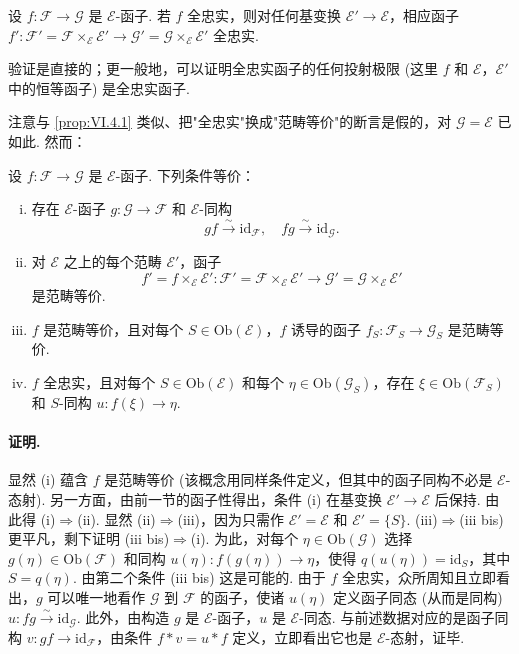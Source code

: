 \begin{proposition}\label{prop:VI.4.1}
设 $f \colon \mathcal{F} \to \mathcal{G}$ 是 $\mathcal{E}$-函子. 若 $f$ 全忠实，则对任何基变换 $\mathcal{E}' \to \mathcal{E}$，相应函子 $f' \colon \mathcal{F}' = \mathcal{F} \times_{\mathcal{E}} \mathcal{E}' \to \mathcal{G}' = \mathcal{G} \times_{\mathcal{E}} \mathcal{E}'$ 全忠实.
\end{proposition}

验证是直接的；更一般地，可以证明全忠实函子的任何投射极限 (这里 $f$ 和 $\mathcal{E}$，$\mathcal{E}'$ 中的恒等函子) 是全忠实函子.

注意与 \ref{prop:VI.4.1} 类似、把"全忠实"换成"范畴等价"的断言是假的，对 $\mathcal{G} = \mathcal{E}$ 已如此. 然而：

\begin{proposition}\label{prop:VI.4.2}
设 $f \colon \mathcal{F} \to \mathcal{G}$ 是 $\mathcal{E}$-函子. 下列条件等价：
\begin{enumerate}[(i)]
\item 存在 $\mathcal{E}$-函子 $g \colon \mathcal{G} \to \mathcal{F}$ 和 $\mathcal{E}$-同构
\[
gf \stackrel{\sim}{\longrightarrow} \mathrm{id}_{\mathcal{F}}, \quad fg \stackrel{\sim}{\longrightarrow} \mathrm{id}_{\mathcal{G}}.
\]
\item 对 $\mathcal{E}$ 之上的每个范畴 $\mathcal{E}'$，函子
\[
f' = f \times_{\mathcal{E}} \mathcal{E}' \colon \mathcal{F}' = \mathcal{F} \times_{\mathcal{E}} \mathcal{E}' \longrightarrow \mathcal{G}' = \mathcal{G} \times_{\mathcal{E}} \mathcal{E}'
\]
是范畴等价.
\item $f$ 是范畴等价，且对每个 $S \in \mathrm{Ob}(\mathcal{E})$，$f$ 诱导的函子 $f_S \colon \mathcal{F}_S \to \mathcal{G}_S$ 是范畴等价.
\item[(iii bis)] $f$ 全忠实，且对每个 $S \in \mathrm{Ob}(\mathcal{E})$ 和每个 $\eta \in \mathrm{Ob}(\mathcal{G}_S)$，存在 $\xi \in \mathrm{Ob}(\mathcal{F}_S)$ 和 $S$-同构 $u \colon f(\xi) \to \eta$.
\end{enumerate}
\end{proposition}

\paragraph*{证明.} 显然 (i) 蕴含 $f$ 是范畴等价 (该概念用同样条件定义，但其中的函子同构不必是 $\mathcal{E}$-态射). 另一方面，由前一节的函子性得出，条件 (i) 在基变换 $\mathcal{E}' \to \mathcal{E}$ 后保持. 由此得 (i)$\Rightarrow$(ii). 显然 (ii)$\Rightarrow$(iii)，因为只需作 $\mathcal{E}' = \mathcal{E}$ 和 $\mathcal{E}' = \{S\}$. (iii)$\Rightarrow$(iii bis) 更平凡，剩下证明 (iii bis)$\Rightarrow$(i). 为此，对每个 $\eta \in \mathrm{Ob}(\mathcal{G})$ 选择 $g(\eta) \in \mathrm{Ob}(\mathcal{F})$ 和同构 $u(\eta) \colon f(g(\eta)) \to \eta$，使得 $q(u(\eta)) = \mathrm{id}_S$，其中 $S = q(\eta)$. 由第二个条件 (iii bis) 这是可能的. 由于 $f$ 全忠实，众所周知且立即看出，$g$ 可以唯一地看作 $\mathcal{G}$ 到 $\mathcal{F}$ 的函子，使诸 $u(\eta)$ 定义函子同态 (从而是同构) $u \colon fg \stackrel{\sim}{\longrightarrow} \mathrm{id}_{\mathcal{G}}$. 此外，由构造 $g$ 是 $\mathcal{E}$-函子，$u$ 是 $\mathcal{E}$-同态. 与前述数据对应的是函子同构 $v \colon gf \to \mathrm{id}_{\mathcal{F}}$，由条件 $f * v = u * f$ 定义，立即看出它也是 $\mathcal{E}$-态射，证毕.

